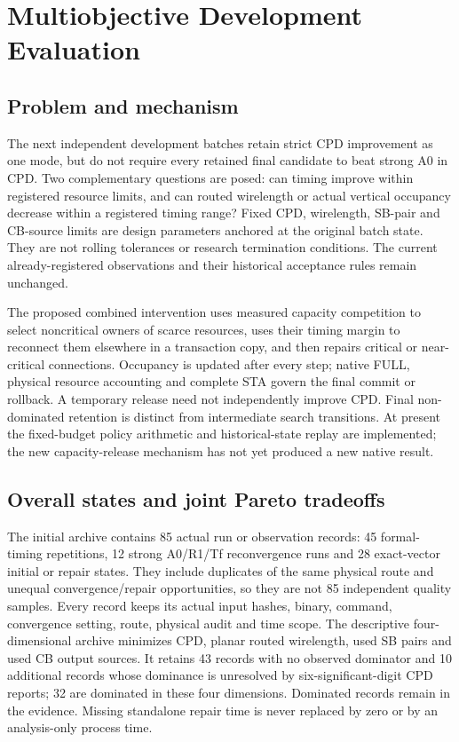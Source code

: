 \section{Multiobjective Development Evaluation}
\subsection{Problem and mechanism}
The next independent development batches retain strict CPD improvement as one mode, but do not require every retained final candidate to beat strong A0 in CPD. Two complementary questions are posed: can timing improve within registered resource limits, and can routed wirelength or actual vertical occupancy decrease within a registered timing range? Fixed CPD, wirelength, SB-pair and CB-source limits are design parameters anchored at the original batch state. They are not rolling tolerances or research termination conditions. The current already-registered observations and their historical acceptance rules remain unchanged.

The proposed combined intervention uses measured capacity competition to select noncritical owners of scarce resources, uses their timing margin to reconnect them elsewhere in a transaction copy, and then repairs critical or near-critical connections. Occupancy is updated after every step; native FULL, physical resource accounting and complete STA govern the final commit or rollback. A temporary release need not independently improve CPD. Final non-dominated retention is distinct from intermediate search transitions. At present the fixed-budget policy arithmetic and historical-state replay are implemented; the new capacity-release mechanism has not yet produced a new native result.

\subsection{Overall states and joint Pareto tradeoffs}
The initial archive contains 85 actual run or observation records: 45 formal-timing repetitions, 12 strong A0/R1/Tf reconvergence runs and 28 exact-vector initial or repair states. They include duplicates of the same physical route and unequal convergence/repair opportunities, so they are not 85 independent quality samples. Every record keeps its actual input hashes, binary, command, convergence setting, route, physical audit and time scope. The descriptive four-dimensional archive minimizes CPD, planar routed wirelength, used SB pairs and used CB output sources. It retains 43 records with no observed dominator and 10 additional records whose dominance is unresolved by six-significant-digit CPD reports; 32 are dominated in these four dimensions. Dominated records remain in the evidence. Missing standalone repair time is never replaced by zero or by an analysis-only process time.

